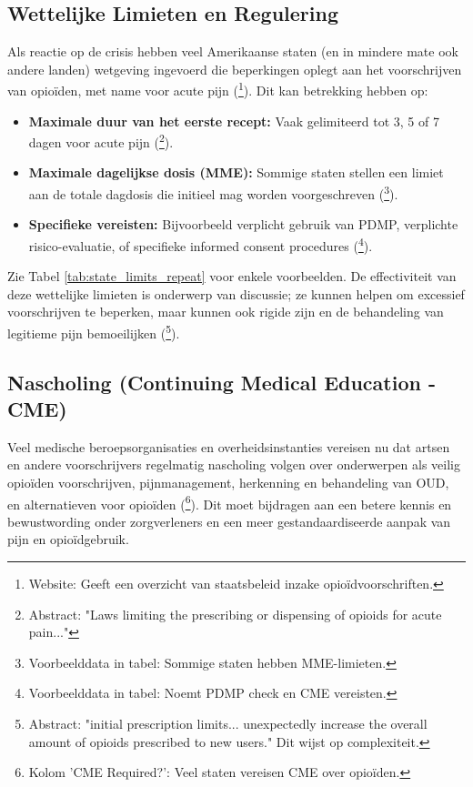 \documentclass[11pt, a4paper]{report} %
\begin{document}
\subsection{Wettelijke Limieten en Regulering}
Als reactie op de crisis hebben veel Amerikaanse staten (en in mindere mate ook andere landen) wetgeving ingevoerd die beperkingen oplegt aan het voorschrijven van opioïden, met name voor acute pijn (\cite{BallotpediaStateLimits}\footnote{Website: Geeft een overzicht van staatsbeleid inzake opioïdvoorschriften.}). Dit kan betrekking hebben op:
\begin{itemize}
    \item \textbf{Maximale duur van het eerste recept:} Vaak gelimiteerd tot 3, 5 of 7 dagen voor acute pijn (\cite{Davis2019LawsLimitingOpioidsAcutePain}\footnote{Abstract: "Laws limiting the prescribing or dispensing of opioids for acute pain..."}).
    \item \textbf{Maximale dagelijkse dosis (MME):} Sommige staten stellen een limiet aan de totale dagdosis die initieel mag worden voorgeschreven (\cite{BallotpediaStateLimits}\footnote{Voorbeelddata in tabel: Sommige staten hebben MME-limieten.}).
    \item \textbf{Specifieke vereisten:} Bijvoorbeeld verplicht gebruik van PDMP, verplichte risico-evaluatie, of specifieke informed consent procedures (\cite{BallotpediaStateLimits}\footnote{Voorbeelddata in tabel: Noemt PDMP check en CME vereisten.}).
\end{itemize}
Zie Tabel \ref{tab:state_limits_repeat} voor enkele voorbeelden. De effectiviteit van deze wettelijke limieten is onderwerp van discussie; ze kunnen helpen om excessief voorschrijven te beperken, maar kunnen ook rigide zijn en de behandeling van legitieme pijn bemoeilijken (\cite{Sacks2019PolicyAffectInitiation}\footnote{Abstract: "initial prescription limits... unexpectedly increase the overall amount of opioids prescribed to new users." Dit wijst op complexiteit.}).

\subsection{Nascholing (Continuing Medical Education - CME)}
Veel medische beroepsorganisaties en overheidsinstanties vereisen nu dat artsen en andere voorschrijvers regelmatig nascholing volgen over onderwerpen als veilig opioïden voorschrijven, pijnmanagement, herkenning en behandeling van OUD, en alternatieven voor opioïden (\cite{BallotpediaStateLimits}\footnote{Kolom 'CME Required?': Veel staten vereisen CME over opioïden.}). Dit moet bijdragen aan een betere kennis en bewustwording onder zorgverleners en een meer gestandaardiseerde aanpak van pijn en opioïdgebruik.
\end{document}
